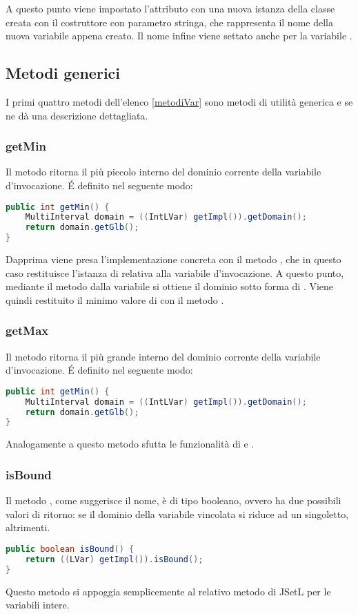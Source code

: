 A questo punto viene impostato l'attributo  con una nuova istanza
della classe  creata con il costruttore con parametro stringa,
che rappresenta il nome della nuova variabile appena creato. Il nome infine 
viene settato anche per la variabile .


\subsection{Metodi generici}
I primi quattro metodi dell'elenco \ref{metodiVar} sono metodi di utilità 
generica e se ne dà una descrizione dettagliata.
\subsubsection{getMin}
Il metodo  ritorna il più piccolo interno del dominio corrente
della variabile d'invocazione. \'E definito nel seguente modo:
\begin{lstlisting}[language = Java,
                   caption = {\files{getMin}.}]
public int getMin() {
	MultiInterval domain = ((IntLVar) getImpl()).getDomain();
	return domain.getGlb();
}
\end{lstlisting}
Dapprima viene presa l'implementazione concreta con il metodo ,
che in questo caso restituisce l'istanza di  relativa alla
variabile d'invocazione. A questo punto, mediante il metodo 
dalla variabile si ottiene il dominio sotto forma di .
Viene quindi restituito il minimo valore di  con il
metodo .

\subsubsection{getMax}
Il metodo  ritorna il più grande interno del dominio corrente
della variabile d'invocazione. \'E definito nel seguente modo:
\begin{lstlisting}[language = Java,
                   caption = {\files{getMax}.}]
public int getMin() {
	MultiInterval domain = ((IntLVar) getImpl()).getDomain();
	return domain.getGlb();
}
\end{lstlisting}
Analogamente a  questo metodo sfutta le funzionalità di
 e .

\subsubsection{isBound}
Il metodo , come suggerisce il nome, è di tipo booleano, ovvero
ha due possibili valori di ritorno:  se il dominio della variabile
vincolata si riduce ad un singoletto,  altrimenti.
\begin{lstlisting}[language = Java,
                   caption = {\files{isBound}.}]
public boolean isBound() {
	return ((LVar) getImpl()).isBound();
}
\end{lstlisting}
Questo metodo si appoggia semplicemente al relativo metodo di JSetL per le
variabili intere.

